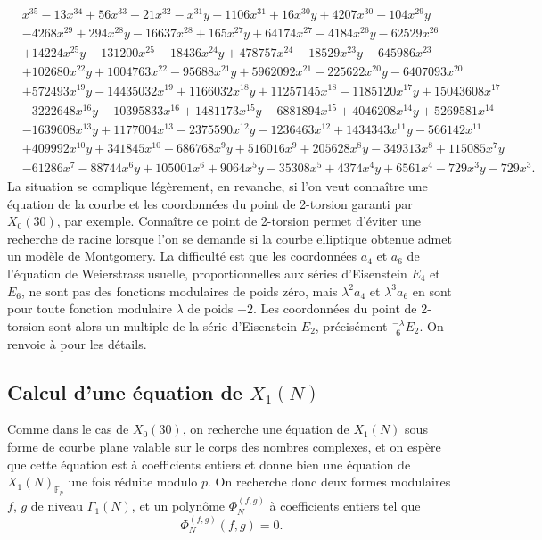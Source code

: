 \documentclass[11pt,a4paper]{article}
\newcommand{\F}{\mathbb{F}}
\theoremstyle{definition}
\begin{document}
$$ \begin{aligned}
&x^{35} - 13x^{34} + 56x^{33} + 21x^{32} - x^{31}y - 1106x^{31} + 16x^{30}y + 4207x^{30} - 104x^{29}y \\
&- 4268x^{29} + 294x^{28}y - 16637x^{28} + 165x^{27}y + 64174x^{27} - 4184x^{26}y - 62529x^{26} \\
 &+ 14224x^{25}y - 131200x^{25} - 18436x^{24}y + 478757x^{24} - 18529x^{23}y - 645986x^{23} \\
 &+ 102680x^{22}y + 1004763x^{22} - 95688x^{21}y + 5962092x^{21} - 225622x^{20}y - 6407093x^{20} \\
 &+ 572493x^{19}y - 14435032x^{19} + 1166032x^{18}y + 11257145x^{18} - 1185120x^{17}y + 15043608x^{17} \\
 &- 3222648x^{16}y - 10395833x^{16} + 1481173x^{15}y - 6881894x^{15} + 4046208x^{14}y + 5269581x^{14} \\
 &- 1639608x^{13}y + 1177004x^{13} - 2375590x^{12}y - 1236463x^{12} + 1434343x^{11}y - 566142x^{11} \\
 &+ 409992x^{10}y + 341845x^{10} - 686768x^9y + 516016x^9 + 205628x^8y - 349313x^8 + 115085x^7y \\
 &- 61286x^7 - 88744x^6y + 105001x^6 + 9064x^5y - 35308x^5 + 4374x^4y + 6561x^4 - 729x^3y - 729x^3.
\end{aligned}
$$
La situation se complique légèrement, en revanche, si l'on veut connaître une équation de la courbe et les coordonnées du point de 2-torsion garanti par $X_0(30)$, par exemple. Connaître ce point de 2-torsion permet d'éviter une recherche de racine lorsque l'on se demande si la courbe elliptique obtenue admet un modèle de Montgomery. La difficulté est que les coordonnées $a_4$ et $a_6$ de l'équation de Weierstrass \og usuelle\fg, proportionnelles aux séries d'Eisenstein $E_4$ et $E_6$, ne sont pas des fonctions modulaires de poids zéro, mais $\lambda^2 a_4$ et $\lambda^3 a_6$ en sont pour toute fonction modulaire $\lambda$ de poids $-2$. Les coordonnées du point de 2-torsion sont alors un multiple de la série d'Eisenstein $E_2$, précisément $\frac{-\lambda}{6} E_2$. On renvoie à \cite{Elkies} pour les détails.

\subsection{Calcul d'une équation de $X_1(N)$}

Comme dans le cas de $X_0(30)$, on recherche une équation de $X_1(N)$ sous forme de courbe plane valable sur le corps des nombres complexes, et on espère que cette équation est à coefficients entiers et donne bien une équation de $X_1(N)_{\F_p}$ une fois réduite modulo $p$. On recherche donc deux formes modulaires $f$, $g$ de niveau $\Gamma_1(N)$, et un polynôme $\Phi_N^{(f, g)}$ à coefficients entiers tel que
$$\Phi_N^{(f, g)}(f, g) = 0.$$
\end{document}
